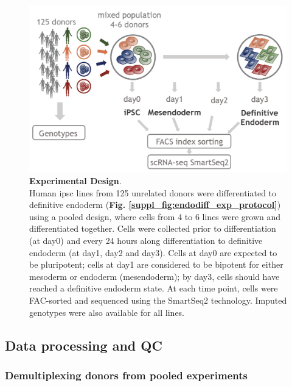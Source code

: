 \begin{figure}[h]
\centering
\includegraphics[width=12cm]{Chapter4/Fig/endodiff_experimental_design.png}
\caption[Experimental Design]{\textbf{Experimental Design}.\\
Human \gls{ipsc} lines from 125 unrelated donors were differentiated to definitive endoderm (\textbf{Fig. \ref{suppl_fig:endodiff_exp_protocol}}) using a pooled design, where cells from 4 to 6 lines were grown and differentiated together.
Cells were collected prior to differentiation (at day0) and every 24 hours along differentiation to definitive endoderm (at day1, day2 and day3).
Cells at day0 are expected to be pluripotent; cells at day1 are considered to be bipotent for either mesoderm or endoderm (mesendoderm); by day3, cells should have reached a definitive endoderm state.
At each time point, cells were FAC-sorted and sequenced using the SmartSeq2 technology.
Imputed genotypes were also available for all lines.}
\label{fig:endodiff_experimental_design}
\end{figure}

\subsection{Data processing and QC}

\subsubsection{Demultiplexing donors from pooled experiments} 


